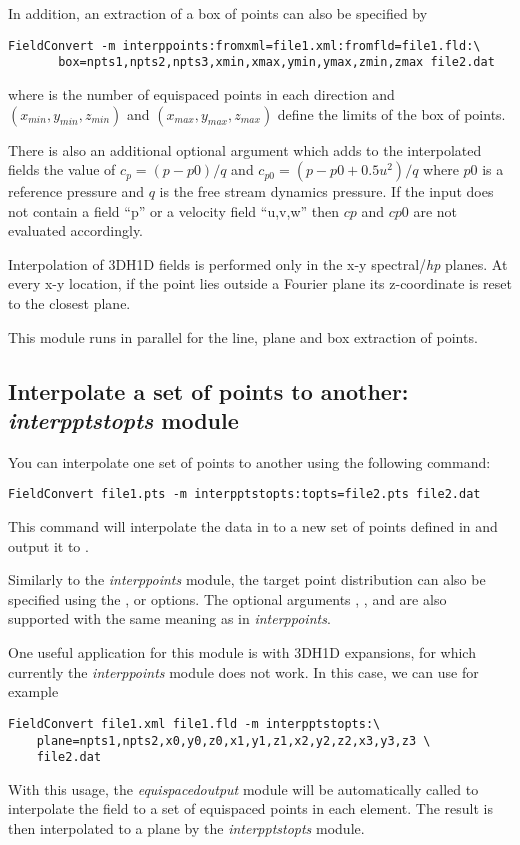 In addition, an extraction of a box of points can also be specified by
\begin{lstlisting}[style=BashInputStyle]
  FieldConvert -m interppoints:fromxml=file1.xml:fromfld=file1.fld:\
       box=npts1,npts2,npts3,xmin,xmax,ymin,ymax,zmin,zmax file2.dat
\end{lstlisting}
where  is the number of equispaced points in each
direction and $(x_{min},y_{min},z_{min})$ and $(x_{max},y_{max},z_{max})$
define the limits of the box of points.

There is also an additional optional argument  which adds to the
interpolated fields the value of $c_p=(p-p0)/q$ and $c_{p0}=(p-p0+0.5 u^2)/q$
where $p0$ is a reference pressure and $q$ is the free stream dynamics pressure.
If the input does not contain a field ``p'' or a velocity field ``u,v,w'' then $cp$
and $cp0$ are not evaluated accordingly.

Interpolation of 3DH1D fields is performed only in the x-y
spectral/\emph{hp} planes. At every x-y location, if the point lies outside a
Fourier plane its z-coordinate is reset to the closest plane.
%
\begin{notebox}
This module  runs in parallel for the line, plane and box extraction of points.
\end{notebox}
%
%
%
\subsection{Interpolate a set of points to another: \textit{interpptstopts} module}
You can interpolate one set of points to another using the following command:
\begin{lstlisting}[style=BashInputStyle]
FieldConvert file1.pts -m interpptstopts:topts=file2.pts file2.dat
\end{lstlisting}
This command will interpolate the data in   to a new set
of points defined in \inltt{file2.pts} and output it to
.

Similarly to the \textit{interppoints} module, the target point distribution
can also be specified using the \inltt{line}, \inltt{plane} or \inltt{box}
options. The optional arguments \inltt{clamptolowervalue},
,  and  are also
supported with the same meaning as in \textit{interppoints}.

One useful application for this module is with 3DH1D expansions, for which
currently the \textit{interppoints} module does not work. In this case, we can
use for example
\begin{lstlisting}[style=BashInputStyle]
FieldConvert file1.xml file1.fld -m interpptstopts:\
    plane=npts1,npts2,x0,y0,z0,x1,y1,z1,x2,y2,z2,x3,y3,z3 \
    file2.dat
\end{lstlisting}
With this usage, the \textit{equispacedoutput} module will be automatically
called to interpolate the field to a set of equispaced points in each element.
The result is then interpolated to a plane by the \textit{interpptstopts} module.

